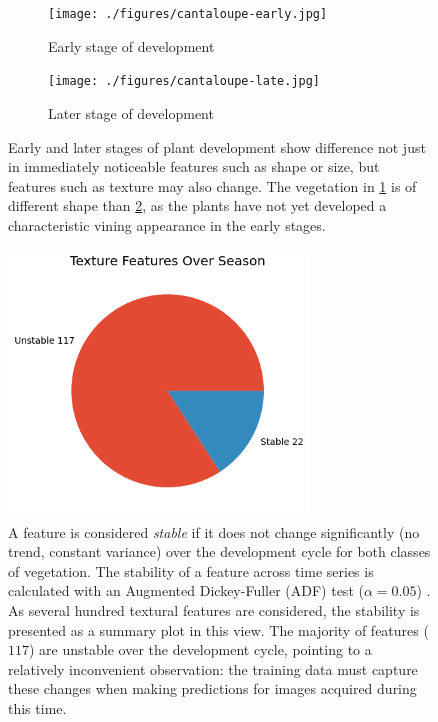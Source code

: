 \documentclass[letterpaper, notitlepage]{report}
\begin{document}
\begin{figure}[H]
	\centering
	\begin{subfigure}[h]{0.45\linewidth}
		\centering
		\texttt{[image: ./figures/cantaloupe-early.jpg]}
		\caption{Early stage of development}
		\label{subfig:cantaloupe-early}	
	\end{subfigure}
	\begin{subfigure}[h]{0.45\linewidth}
		\centering
		\texttt{[image: ./figures/cantaloupe-late.jpg]}
		\caption{Later stage of development}
		\label{subfig:cantaloupe-late}		
	\end{subfigure}%
	\caption[Early and later stages of vining plant development]{Early and later stages of plant development show difference not just in immediately noticeable features such as shape or size, but features such as texture may also change. The vegetation in \ref{subfig:cantaloupe-early} is of different shape  than \ref{subfig:cantaloupe-late}, as the plants have not yet developed a characteristic vining appearance in the early stages.}
	\label{fig:cantaloupe}
\end{figure}
%


\begin{figure}[h!]
	\centering
	\includegraphics[width=8cm]{./figures/season-texture.png}
	\caption[Stability of factor over growing season]{A feature is considered \textit{stable} if it does not change significantly (no trend, constant variance) over the development cycle for both classes of vegetation. The stability of a feature across time series is calculated with an Augmented Dickey-Fuller (ADF) test ($\alpha=0.05$) \parencite{Dickey1979-ft}. As several hundred textural features are considered, the stability is presented as a summary plot in this view. The majority of features ($117$) are unstable over the development cycle, pointing to a relatively inconvenient observation: the training data must capture these changes when making predictions for images acquired during this time.}
	\label{fig:season-texture}
\end{figure}
\end{document}
